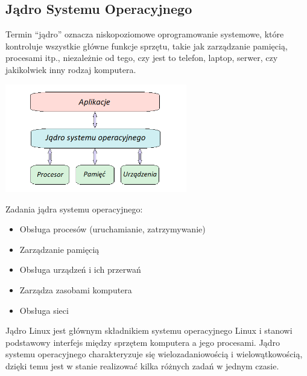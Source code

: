 \documentclass[10pt,a4paper]{report}
\begin{document}
\begin{adjustwidth}{2cm}{2cm}
\section{Jądro Systemu Operacyjnego}
\begin{minipage}{1\linewidth}
Termin “jądro” oznacza niskopoziomowe oprogramowanie systemowe, które kontroluje wszystkie główne funkcje sprzętu, takie jak zarządzanie pamięcią, procesami itp., niezależnie od tego, czy jest to telefon, laptop, serwer, czy jakikolwiek inny rodzaj komputera. \\ 
\end{minipage}
 \begin{minipage}{\linewidth}
\begin{center}
  \includegraphics[width=300px]{img/jadro}
\end{center}
\end{minipage}
\begin{minipage}{1\linewidth}
Zadania jądra systemu operacyjnego: \\
\begin{adjustwidth}{0.5cm}{0cm}
\begin{itemize}
\setlength\itemsep{0.3cm}
    \item[\ding{118}] Obsługa procesów (uruchamianie, zatrzymywanie)
    \item[\ding{118}] Zarządzanie pamięcią
    \item[\ding{118}] Obsługa urządzeń i ich przerwań
    \item[\ding{118}] Zarządza zasobami komputera 
    \item[\ding{118}] Obsługa sieci 
\end{itemize}
\end{adjustwidth}
\vspace{0.3cm}
Jądro Linux jest głównym składnikiem systemu operacyjnego Linux i stanowi podstawowy interfejs między sprzętem komputera a jego procesami. Jądro systemu operacyjnego charakteryzuje się wielozadaniowością i wielowątkowością, dzięki temu jest w stanie realizować kilka różnych zadań w jednym czasie. 
\end{minipage}

\end{adjustwidth}
\end{document}
